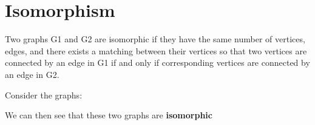 \documentclass{report}
\begin{document}
    \section{\LARGE Isomorphism}
    \smallbreak \noindent
    \begin{definition}
        Two graphs G1 and G2 are isomorphic if they have the same number of vertices, edges, and there exists a matching between their vertices so that two vertices are connected by an edge in G1 if and only if corresponding vertices are connected by an edge in G2.
    \end{definition}
    \bigbreak \noindent 
    Consider the graphs:
    \bigbreak \noindent 
    \begin{minipage}[]{0.47\textwidth}
    \end{minipage}
    \begin{minipage}[]{0.47\textwidth}
    \end{minipage}
    \bigbreak \noindent 
    We can then see that these two graphs are \textbf{isomorphic}
    \bigbreak \noindent 

    





    
    
    
    
    
    

     
\end{document}
